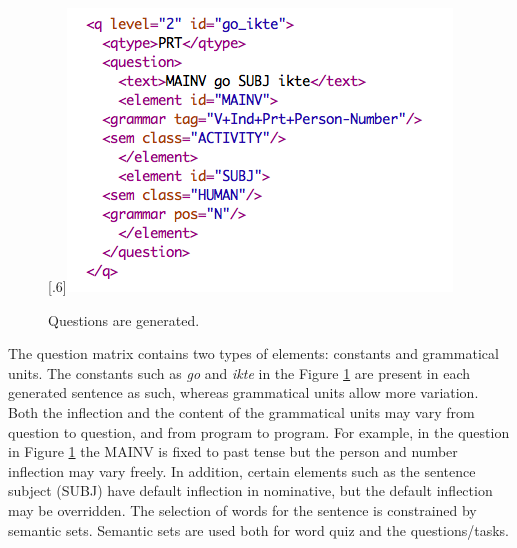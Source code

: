 \documentclass[11pt]{article}
\begin{document}
\begin{figure}[htbp]
\begin{center}
\scalebox{.6}[.6]{\includegraphics{presentation/img/question_vasta.png}}\\
\caption{Questions are generated.}
\label{questionv}
\end{center}
\end{figure}

The question matrix contains two types of elements: constants and grammatical units. The constants such as \textit{go} and \textit{ikte} in the Figure \ref{questionv} are present in each generated sentence as such, whereas grammatical units allow more variation. Both the inflection and the content of the grammatical units may vary from question to question, and from program to program. For example, in the question in Figure \ref{questionv} the MAINV is fixed to past tense but the person and number inflection may vary freely. In addition, certain elements such as the sentence subject (SUBJ) have default inflection in nominative, but the default inflection may be overridden. The selection of words for the sentence is constrained by semantic sets. Semantic sets are used both for word quiz and the questions/tasks. 
%
\end{document}
